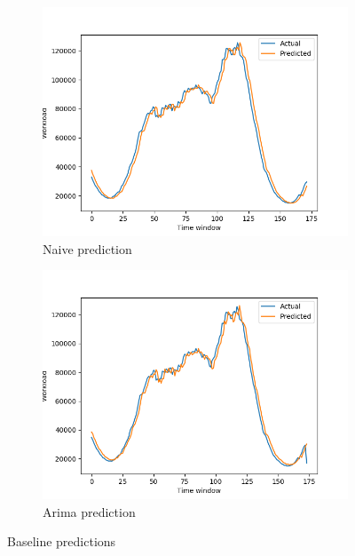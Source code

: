 \documentclass[12pt]{article}
\begin{document}
  \begin{figure}
    \centering
    \begin{subfigure}[b]{0.48\linewidth}
      \includegraphics[width=\linewidth]{resources/baseline/naive_predictions_10.png}
      \caption{Naive prediction}
    \end{subfigure}
    \begin{subfigure}[b]{0.48\linewidth}
      \includegraphics[width=\linewidth]{resources/baseline/arima_10.png}
      \caption{Arima prediction}
    \end{subfigure}
    \caption{Baseline predictions}
    \label{fig:baseline_pred}
  \end{figure}
\end{document}
